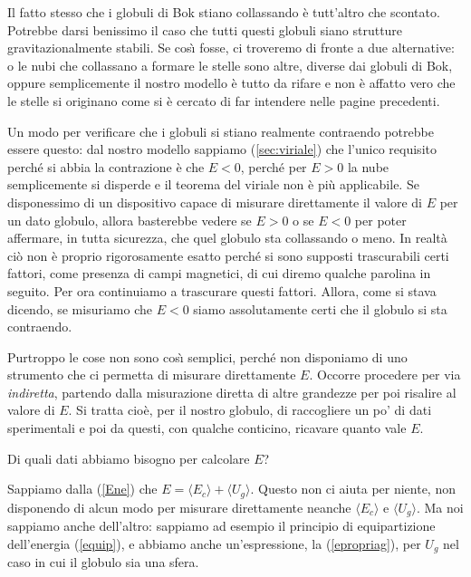 \smallskip

Il fatto stesso che i globuli di Bok stiano collassando \`{e} tutt'altro che scontato.
Potrebbe darsi benissimo il caso che tutti questi globuli siano strutture gravitazionalmente stabili. Se cos\`{\i}{} fosse, ci troveremo di fronte a due alternative: o le nubi che collassano a formare le stelle sono altre, diverse dai globuli di Bok, oppure semplicemente il nostro modello \`{e} tutto da rifare e non \`{e} affatto vero che le stelle si originano come si \`{e} cercato di far intendere nelle pagine precedenti.
\par
Un modo per verificare che i globuli si stiano realmente contraendo potrebbe essere questo: dal nostro modello sappiamo (\ref{sec:viriale}) che l'unico requisito perch\'{e} si abbia la contrazione \`{e} che $E<0$, perch\'{e} per $E>0$ la nube semplicemente si disperde e il teorema del viriale non \`{e} pi\`{u} applicabile.
Se disponessimo di un dispositivo capace di misurare direttamente il valore di
$E$ per un dato globulo, allora basterebbe vedere se $E>0$ o se $E<0$ per poter
affermare, in tutta sicurezza, che quel globulo sta collassando o meno. In
realt\`{a} ci\`{o} non \`{e} proprio rigorosamente esatto perch\'{e} si sono supposti trascurabili certi fattori, come presenza di campi magnetici, di cui diremo qualche parolina in seguito. Per ora continuiamo a trascurare questi fattori.
Allora, come si stava dicendo, se misuriamo che $E<0$ siamo assolutamente certi che il globulo si sta contraendo.
\par
Purtroppo le cose non sono cos\`{\i}{} semplici, perch\'{e} non disponiamo di uno strumento che ci permetta di misurare direttamente $E$. Occorre procedere per via \emph{indiretta}, partendo dalla misurazione diretta di altre grandezze per poi risalire al valore di $E$. Si tratta cio\`{e}, per il nostro globulo, di raccogliere un po' di dati sperimentali e poi da questi, con qualche conticino, ricavare quanto vale $E$.
\par
Di quali dati abbiamo bisogno per calcolare $E$?
\par
Sappiamo dalla (\ref{Ene}) che $E=\langle E_{c} \rangle+\langle U_{g} \rangle$. Questo non ci aiuta per niente, non disponendo di alcun modo per misurare direttamente neanche $\langle E_{c} \rangle$ e $\langle U_{g} \rangle$.
Ma noi sappiamo anche dell'altro: sappiamo ad esempio il principio di equipartizione dell'energia (\ref{equip}), e abbiamo anche un'espressione, la (\ref{epropriag}), per $U_{g}$ nel caso in cui il globulo sia una sfera.
\par
